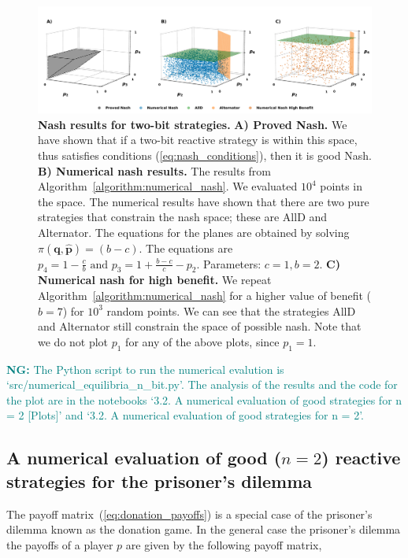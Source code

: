\documentclass{article}
\theoremstyle{definition}
\newcommand{\nikoleta}[1]{\textcolor{teal}{{\bf NG:} #1}}
\begin{document}
\begin{figure}[!htbp]
     \centering
     \includegraphics[width=\textwidth]{static/two_bit_reactive_numerical_results.pdf}
     \caption{\textbf{Nash results for two-bit strategies.}
     \textbf{A) Proved Nash.} We have shown that if a two-bit reactive
     strategy is within this space, thus satisfies conditions
     (\ref{eq:nash_conditions}), then it is good Nash. \textbf{B) Numerical nash
     results.} The results from
     Algorithm~\ref{algorithm:numerical_nash}. We evaluated \(10 ^ 4\) points in
     the space. The numerical results have shown that there are two pure
     strategies that constrain the nash space; these are AllD and Alternator.
     The equations for the planes are obtained by solving
     \(\pi(\mathbf{q}, \mathbf{\hat{p}}) = (b - c)\). The equations are
     \(p_4 = 1 - \frac{c}{b} \text{ and }  p_3 = 1 + \frac{b - c}{c} - p_2\).
      Parameters: \(c=1, b=2\). \textbf{C) Numerical nash for high benefit.} We repeat
     Algorithm~\ref{algorithm:numerical_nash} for a higher value of benefit
     (\(b=7\)) for \(10 ^ 3\) random points. We can see that the strategies AllD
     and Alternator still constrain the space of possible nash. Note that we do
     not plot \(p_1\) for any of the above plots, since \(p_1=1\).}\label{fig:two_bit_reactive_nash_results}
\end{figure}

\nikoleta{The Python script to run the numerical evalution is
`src/numerical\_equilibria\_n\_bit.py'. The analysis of the results and the code
for the plot are in the notebooks `3.2. A numerical evaluation of good
strategies for n = 2 [Plots]' and `3.2. A numerical evaluation of good
strategies for n = 2'.}

\subsection{A numerical evaluation of good (\(n=2\)) reactive strategies for the prisoner's dilemma}\label{section:good_strategies_numerically_pd}

The payoff matrix~(\ref{eq:donation_payoffs}) is a special case of the
prisoner's dilemma known as the donation game. In the general case the
prisoner's dilemma the payoffs of a player \(p\) are given by the following
payoff matrix,
\end{document}
